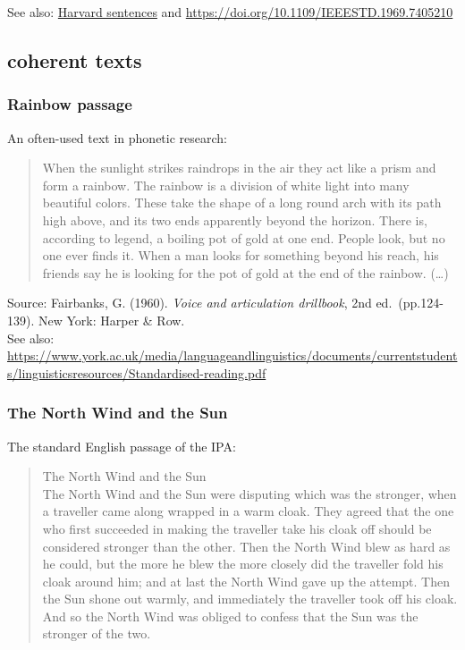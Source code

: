 \documentclass[
]{book}
\begin{document}
See also: \href{https://en.wikipedia.org/wiki/Harvard_sentences}{Harvard sentences} and \url{https://doi.org/10.1109/IEEESTD.1969.7405210}

\subsection{coherent texts}\label{coherent-texts-1}

\subsubsection{Rainbow passage}\label{rainbow-passage}

An often-used text in phonetic research:

\begin{quote}
When the sunlight strikes raindrops in the air they act like a prism and form a rainbow.
The rainbow is a division of white light into many beautiful colors.
These take the shape of a long round arch with its path high above, and its two ends apparently beyond the horizon.
There is, according to legend, a boiling pot of gold at one end.
People look, but no one ever finds it.
When a man looks for something beyond his reach, his friends say he is looking for the pot of gold at the end of the rainbow. (\ldots)
\end{quote}

Source: Fairbanks, G. (1960). \emph{Voice and articulation drillbook}, 2nd ed.~(pp.124-139). New York: Harper \& Row.\\
See also: \url{https://www.york.ac.uk/media/languageandlinguistics/documents/currentstudents/linguisticsresources/Standardised-reading.pdf}

\subsubsection{The North Wind and the Sun}\label{the-north-wind-and-the-sun}

The standard English passage of the IPA:

\begin{quote}
The North Wind and the Sun\\
The North Wind and the Sun were disputing which was the stronger, when a traveller came along wrapped in a
warm cloak. They agreed that the one who first succeeded in making the traveller take his cloak off should be considered stronger than the other. Then the North Wind blew as hard as he could, but the more he blew the more closely did the traveller fold his cloak around him; and at last the North Wind gave up the attempt. Then the Sun shone out warmly, and immediately the traveller took off his cloak. And so the North Wind was obliged to confess that the Sun was the stronger of the two.
\end{quote}
\end{document}
